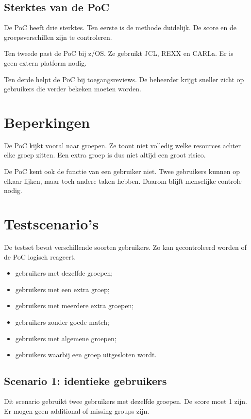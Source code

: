 \subsection*{Sterktes van de PoC}

De PoC heeft drie sterktes. Ten eerste is de methode duidelijk. De score en de groepsverschillen zijn te controleren.

Ten tweede past de PoC bij z/OS. Ze gebruikt JCL, REXX en CARLa. Er is geen extern platform nodig.

Ten derde helpt de PoC bij toegangsreviews. De beheerder krijgt sneller zicht op gebruikers die verder bekeken moeten worden.

\section{Beperkingen}

De PoC kijkt vooral naar groepen. Ze toont niet volledig welke resources achter elke groep zitten. Een extra groep is dus niet altijd een groot risico.

De PoC kent ook de functie van een gebruiker niet. Twee gebruikers kunnen op elkaar lijken, maar toch andere taken hebben. Daarom blijft menselijke controle nodig.

\section{Testscenario's}

De testset bevat verschillende soorten gebruikers. Zo kan gecontroleerd worden of de PoC logisch reageert.

\begin{itemize}
	\item gebruikers met dezelfde groepen;
	\item gebruikers met een extra groep;
	\item gebruikers met meerdere extra groepen;
	\item gebruikers zonder goede match;
	\item gebruikers met algemene groepen;
	\item gebruikers waarbij een groep uitgesloten wordt.
\end{itemize}

\subsection*{Scenario 1: identieke gebruikers}

Dit scenario gebruikt twee gebruikers met dezelfde groepen. De score moet 1 zijn. Er mogen geen additional of missing groups zijn.

